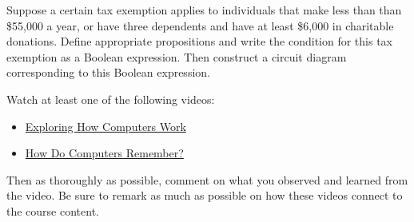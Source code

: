 \documentclass[11pt,letterpaper]{article}
\begin{document}
 Suppose a certain tax exemption applies to individuals that make less than than \$55,000 a year, or have three dependents and have at least \$6,000 in charitable donations. Define appropriate propositions and write the condition for this tax exemption as a Boolean expression. Then construct a circuit diagram corresponding to this Boolean expression. 



\newpage



 Watch at least one of the following videos:
	\begin{itemize}
	\item \href{https://www.youtube.com/watch?v=QZwneRb-zqA&ab_channel=SebastianLague}{Exploring How Computers Work}
	\item \href{https://www.youtube.com/watch?v=I0-izyq6q5s&ab_channel=SebastianLague}{How Do Computers Remember?}
	\end{itemize}
Then as thoroughly as possible, comment on what you observed and learned from the video. Be sure to remark as much as possible on how these videos connect to the course content. 
\end{document}
